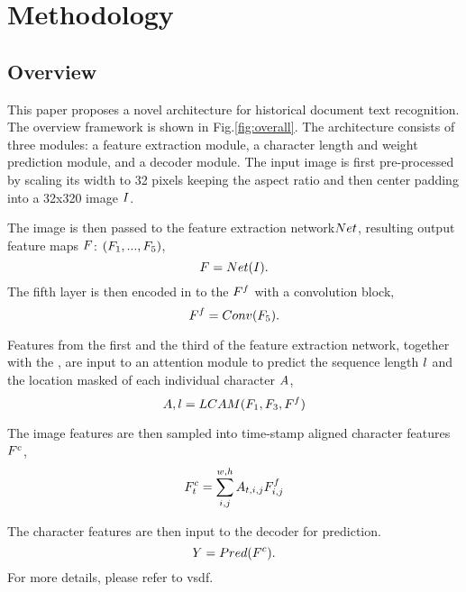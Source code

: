 \section{Methodology}

\subsection{Overview}

This paper proposes a novel architecture for historical document text recognition. The overview framework is shown in Fig.\ref{fig:overall}. The architecture consists of three modules: a feature extraction module, a character length and weight prediction module, and a decoder module. The input image is first pre-processed by scaling its width to 32 pixels keeping the aspect ratio and then center padding into a 32x320 image $I$. 

The image is then passed to the feature extraction network$Net$, resulting output feature maps $F$: $(F_{{1}}, ... ,F_{{5}})$, 
\begin{equation}
    F=Net(I).
\end{equation}
The fifth layer is then encoded in to the \Tefinalfeat{} $F^f{}$ with a convolution block,
\begin{equation}
    F^f=Conv(F_{{5}}).
\end{equation}

Features from the first and the third of the feature extraction network, together with the \Tefinalfeat{}, are input to an attention module to predict the sequence length $l$ and the location masked of each individual character $A$,
\begin{equation}
    A,l=LCAM(F_{{1}}, F_{{3}}, F^f{})
\end{equation}

The image features are then sampled into time-stamp aligned character features $F^{c}$, 
\begin{equation}
    F^{c}_{{t}}=\sum_{i,j}^{w,h} A_{t,i,j}F^f_{i,j}
\end{equation}

The character features are then input to the decoder for prediction. 
\begin{equation}
    Y=Pred(F^{c}).
\end{equation}
For more details, please refer to vsdf\cite{vsdf}.

